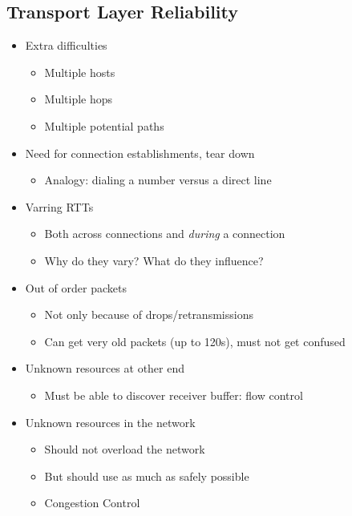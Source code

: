 \subsection{Transport Layer Reliability}
\begin{itemize}[nosep]
    \item Extra difficulties
          \begin{itemize}[nosep]
              \item Multiple hosts
              \item Multiple hops
              \item Multiple potential paths
          \end{itemize}
    \item Need for connection establishments, tear down
          \begin{itemize}[nosep]
              \item Analogy: dialing a number versus a direct line
          \end{itemize}
    \item Varring RTTs
          \begin{itemize}[nosep]
              \item Both across connections and \emph{during} a connection
              \item Why do they vary? What do they influence?
          \end{itemize}
    \item Out of order packets
          \begin{itemize}[nosep]
              \item Not only because of drops/retransmissions
              \item Can get very old packets (up to 120s), must not get confused
          \end{itemize}
    \item Unknown resources at other end
          \begin{itemize}[nosep]
              \item Must be able to discover receiver buffer: flow control
          \end{itemize}
    \item Unknown resources in the network
          \begin{itemize}[nosep]
              \item Should not overload the network
              \item But should use as much as safely possible
              \item Congestion Control
          \end{itemize}
\end{itemize}
